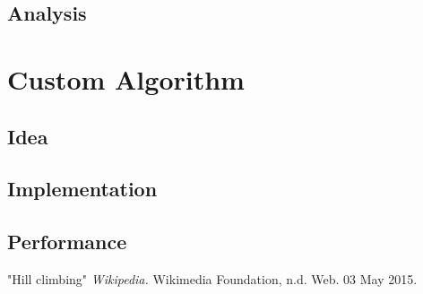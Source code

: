 \documentclass[a4paper,oneside,10pt]{report}
\begin{document}
\section {Analysis} \label{compAnal}

\chapter{Custom Algorithm} \label{custom}

\section {Idea} \label{custIdea}
\section {Implementation} \label{custImp}
\section {Performance} \label{custPerf}


\clearpage
{}
\begin{thebibliography}{9}

"Hill climbing"
\textit{Wikipedia.} 
 Wikimedia Foundation, n.d. Web. 03 May 2015.

\end{thebibliography}

\appendix
\end{document}
